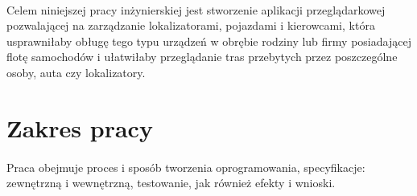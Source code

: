 \paragraph{}
Celem niniejszej pracy inżynierskiej jest stworzenie aplikacji przeglądarkowej pozwalającej na zarządzanie lokalizatorami, pojazdami i kierowcami, która usprawniłaby obługę tego typu urządzeń w obrębie rodziny lub firmy posiadającej flotę samochodów i ułatwiłaby przeglądanie tras przebytych przez poszczególne osoby, auta czy lokalizatory.

\section{Zakres pracy}
\paragraph{}
 Praca obejmuje proces i sposób tworzenia oprogramowania, specyfikacje: zewnętrzną i wewnętrzną, testowanie, jak również efekty i wnioski.


